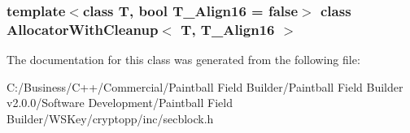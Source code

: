 \subsubsection*{template$<$class T, bool T\_\-Align16 = false$>$ class AllocatorWithCleanup$<$ T, T\_\-Align16 $>$}



The documentation for this class was generated from the following file:\begin{DoxyCompactItemize}
\item 
C:/Business/C++/Commercial/Paintball Field Builder/Paintball Field Builder v2.0.0/Software Development/Paintball Field Builder/WSKey/cryptopp/inc/secblock.h\end{DoxyCompactItemize}
